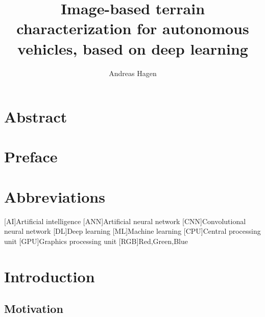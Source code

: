 \documentclass[USenglish]{ifimaster}  %
\title{Image-based terrain characterization for autonomous vehicles, based on deep learning}        %
\author{Andreas Hagen}                      %
\begin{document}
\duoforside[dept={Department of Technology Systems},   %
  program={Cybernetics},  %
  short]                                        %

\frontmatter{}
\chapter*{Abstract}                   %

\tableofcontents{}
\listoffigures{}
\listoftables{}

\chapter*{Preface}
\chapter*{Abbreviations}
\begin{acronym}
        [AI]{Artificial intelligence}
        [ANN]{Artificial neural network}
        [CNN]{Convolutional neural network}
        [DL]{Deep learning}
        [ML]{Machine learning}
        [CPU]{Central processing unit}
        [GPU]{Graphics processing unit}
        [RGB]{Red,Green,Blue}
\end{acronym}


\mainmatter{}
\chapter{Introduction}                  
\section{Motivation}
\end{document}

